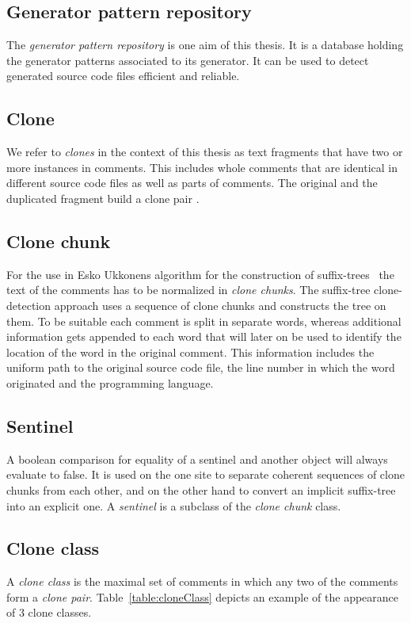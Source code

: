 \subsection{Generator pattern repository}
The \textit{generator pattern repository} is one aim of this thesis. It is a database holding the generator patterns associated to its generator. It can be used to detect generated source code files efficient and reliable.

\subsection{Clone}
We refer to \textit{clones} in the context of this thesis as text fragments that have two or more instances in comments. This includes whole comments that are identical in different source code files as well as parts of comments. The original and the duplicated fragment build a clone pair \cite{Roy2007}. 

\subsection{Clone chunk}
For the use in Esko Ukkonens algorithm for the construction of suffix-trees~\cite{Ukkonen1995} the text of the comments has to be normalized in \textit{clone chunks}. The suffix-tree clone-detection approach uses a sequence of clone chunks and constructs the tree on them. To be suitable each comment is split in separate words, whereas additional information gets appended to each word that will later on be used to identify the location of the word in the original comment. This information includes the uniform path to the original source code file, the line number in which the word originated and the programming language.

\subsection{Sentinel}
\label{section:sentinel}
A boolean comparison for equality of a sentinel and another object will always evaluate to false. It is used on the one site to separate coherent sequences of clone chunks from each other, and on the other hand to convert an implicit suffix-tree into an explicit one. A \textit{sentinel} is a subclass of the \textit{clone chunk} class. 

\subsection{Clone class}
A \textit{clone class} is the maximal set of comments in which any two of the comments form a \textit{clone pair}.
Table~\ref{table:cloneClass} depicts an example of the appearance of 3
clone classes.


